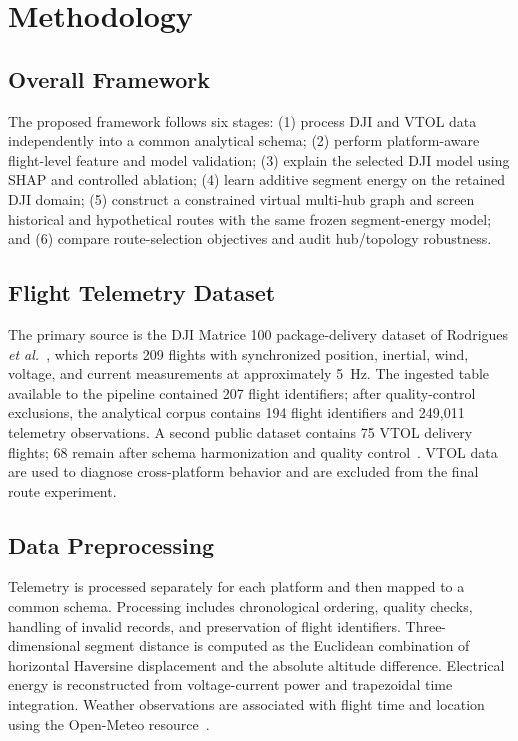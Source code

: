 \documentclass[conference,a4paper]{IEEEtran}
\begin{document}
\section{Methodology}

\subsection{Overall Framework}
The proposed framework follows six stages: (1) process DJI and VTOL data
independently into a common analytical schema; (2) perform platform-aware
flight-level feature and model validation; (3) explain the selected DJI model
using SHAP and controlled ablation; (4) learn additive segment energy on the
retained DJI domain; (5) construct a constrained virtual multi-hub graph and
screen historical and hypothetical routes with the same frozen segment-energy
model; and (6) compare route-selection objectives and audit hub/topology robustness.

\subsection{Flight Telemetry Dataset}
The primary source is the DJI Matrice 100 package-delivery dataset of Rodrigues \emph{et al.}~\cite{rodrigues2021}, which reports 209 flights with synchronized position, inertial, wind, voltage, and current measurements at approximately 5~Hz. The ingested table available to the pipeline contained 207 flight identifiers; after quality-control exclusions, the analytical corpus contains 194 flight identifiers and 249,011 telemetry observations. A second public dataset contains 75 VTOL delivery flights; 68 remain after schema harmonization and quality control~\cite{booker2023}. VTOL data are used to diagnose cross-platform behavior and are excluded from the final route experiment.

\subsection{Data Preprocessing}
Telemetry is processed separately for each platform and then mapped to a common schema. Processing includes chronological ordering, quality checks, handling of invalid records, and preservation of flight identifiers. Three-dimensional segment distance is computed as the Euclidean combination of horizontal Haversine displacement and the absolute altitude difference. Electrical energy is reconstructed from voltage-current power and trapezoidal time integration. Weather observations are associated with flight time and location using the Open-Meteo resource~\cite{zippenfenig2023}.
\end{document}
